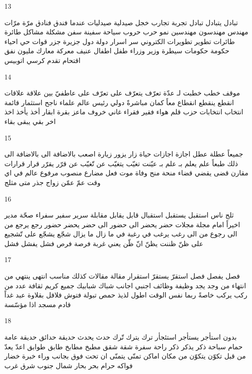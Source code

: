 \documentclass[twocolumn,a4paper]{article}
\begin{document}
13

\textarabic{ تبادل  يتبادل  
 تبادل  
 تجربة  تجارب  
 خجل  
 صيدلية  صيدليات
 عندما  
 فندق  فنادق  
 مرّة  مرّات
 مهندس  مهندسون
  مهندسين
  نمو  
 حرب  حروب  
 سياحة  
 سفينة  سفن  
 مشكلة  مشاكل  
 طائرة  طائرات
 تطوير  تطويرات
 الكتروني  
  سر  اسرار  
 دولة  دول  
 جزيرة  جزر  
 قوات  
 حي  احياء  
 حكومة  حكومات
 سيطرة  
 وزير  وزراء  
 طفل  اطفال  
 عنيف  
 معركة  معارك  
 مليون  
 نفق  
 اقتحام  
 تقدم  
 كرسي  
 اتوبيس  
}

14

\textarabic{ موقف  
 خطب  خطبت لـ  
 عدّة  
 تعرّف  يتعرّف على  
 تعرّف على  
 عاطفيّ  
 بين  
 علاقة  علاقات
 انقطع  ينقطع  
 انقطاع  
 معاً  
 كمان  
 مباشرةً  
 دولي  
 رئيس  
 عالم  علماء  
 ناجح  
 استثمار  
 قائمة  
 انتخاب  انتخابات
 حزب  
 قلم  
 هواء  
 فقير  فقراء   
 غاني  
 خروف  
 ماعز  
 بقرة  ابقار  
 أخذ  يأخذ  
 اخذ  
 اخر  
 بقي  يبقى  
 بقاء  
}

15

\textarabic{ جميعاً  
 عطلة  عطل  
 اجازة  اجازات
 حياة  
 زار  يزور  
 زيارة  
 اصعب  
 باﻻضافة الى  
 باﻻضافة الى ذلك  
 طبعاً  
 علم  يعلم بـ  
 علم بـ  
 عيّنت  
 تغيّب  يتغيّب عن  
 تّغيّب عن  
 قرّر  يقرّر  
 قرار  قرارات
 مقارن  
 قضى  يقضي  
 قضاء  
 منحة  منح  
 وفاة  
 موت  
 فعل مضارع  
 منصوب  
 مرفوع  
 عالم  
 في اي وقت  
 عمّ  
 عمّن 
 زواج  
 جذر  
 متى  
 مثلج  
}

16

\textarabic{ ثلج  
 ناس  
 استقبل  يستقبل  
 استقبال  
 قابل  يقابل  
 مقابلة  
 سرير  
 سفير  سفراء  
 صحّة  
 مدير  
 اخيراً  
 امام  
 مجلة  مجلات
 حضر  يحضر الى  
 حضور الى  
 حضر  يحضر  
 حضور  
 رجع  يرجع من  الى  
 رجوع من  الى  
 رغب  يرغب في  
 رغبة في  
 ما زال  ما يزال  
 شجّع  يشجّع على  
 تّشجيع على  
 ظنّ  ظننت  يظنّ انّ  
 ظّن  
 يعني  
 غربة  
 فرصة  فرص  
 فشل  يفشل  
 فشل  
}

17

\textarabic{ فصل  يفصل  
 فصل  
 استقرّ  يستقرّ  
 استقرار  
 مقالة  مقالات
 كذلك  
 مناسب  
 انتهى  ينتهي من  
 انتهاء من  
 وجد  يجد  
 وظيفة  وظائف  
 اجنبي  اجانب  
 شباك  شبابيك  
 جميع  
 كريم  
 ثقافة  
 عدد من  
 ركب  يركب  
 خاصةً  
 ربما  
 نفس الوقت  
 اطول  
 لذيذ  
 حمص  
 تبولة  
 فتوش  
 فلافل  
 بقلاوة  
 عبد  
 غداً  
 قادم  
 مسجد  
 اذا  
 مؤسّسة  
}

18

\textarabic{ بدون  
 استأجر  يستأجر  
 استئجأر  
 ترك  يترك  
 تّرك  
 حدث  يحدث  
 حديقة  حدائق  
 حديقة عامة  
 حمام سباحة  
 ذكر  يذكر  
 ذكر  
 راحة  
 سفرة  
 شقة  شقق 
 مطبخ  مطابخ  
 طابق  طوابق  
 اعدّ  يعدّ  
 من قبل  
 تكوّن  يتكوّن من  
 مكان  اماكن  
 تمنّى  يتمنّى ان  
 تحت  
 فوق  
 بجانب  
 وراء  
 خبرة  
 خضار  
 فواكه  
 حرام  
 بحر  بحار  
 شمال  
 جنوب  
 شرق  
 غرب  
}
\end{document}
